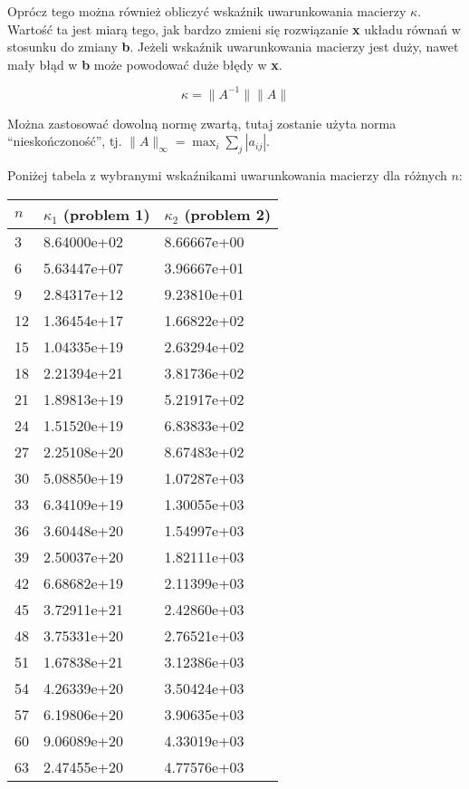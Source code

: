 \documentclass{article}
\begin{document}
Oprócz tego można również obliczyć wskaźnik uwarunkowania macierzy $\kappa$. Wartość ta jest miarą tego, jak bardzo zmieni się rozwiązanie
\textbf{x} układu równań w stosunku do zmiany \textbf{b}. Jeżeli wskaźnik uwarunkowania macierzy jest duży, nawet mały błąd w 
\textbf{b} może powodować duże błędy w \textbf{x}.

$$\kappa=\|A^{-1}\|\|A\|$$

Można zastosować dowolną normę zwartą, tutaj zostanie użyta norma ``nieskończoność'', tj. $\displaystyle\|A\|_{\infty}=\max_{i}\sum_{j}|a_{ij}|$.

Poniżej tabela z wybranymi wskaźnikami uwarunkowania macierzy dla różnych $n$:

\begin{table}[H]
\centering
\begin{tabular}{|l|l|l|}
\hline
$n$ & $\kappa_1$ (problem 1) & $\kappa_2$ (problem 2)\\ \hline
3 & 8.64000e+02 & 8.66667e+00 \\ \hline
6 & 5.63447e+07 & 3.96667e+01 \\ \hline
9 & 2.84317e+12 & 9.23810e+01 \\ \hline
12 & 1.36454e+17 & 1.66822e+02 \\ \hline
15 & 1.04335e+19 & 2.63294e+02 \\ \hline
18 & 2.21394e+21 & 3.81736e+02 \\ \hline
21 & 1.89813e+19 & 5.21917e+02 \\ \hline
24 & 1.51520e+19 & 6.83833e+02 \\ \hline
27 & 2.25108e+20 & 8.67483e+02 \\ \hline
30 & 5.08850e+19 & 1.07287e+03 \\ \hline
33 & 6.34109e+19 & 1.30055e+03 \\ \hline
36 & 3.60448e+20 & 1.54997e+03 \\ \hline
39 & 2.50037e+20 & 1.82111e+03 \\ \hline
42 & 6.68682e+19 & 2.11399e+03 \\ \hline
45 & 3.72911e+21 & 2.42860e+03 \\ \hline
48 & 3.75331e+20 & 2.76521e+03 \\ \hline
51 & 1.67838e+21 & 3.12386e+03 \\ \hline
54 & 4.26339e+20 & 3.50424e+03 \\ \hline
57 & 6.19806e+20 & 3.90635e+03 \\ \hline
60 & 9.06089e+20 & 4.33019e+03 \\ \hline
63 & 2.47455e+20 & 4.77576e+03 \\ \hline

\end{tabular}
\end{table}
\end{document}
